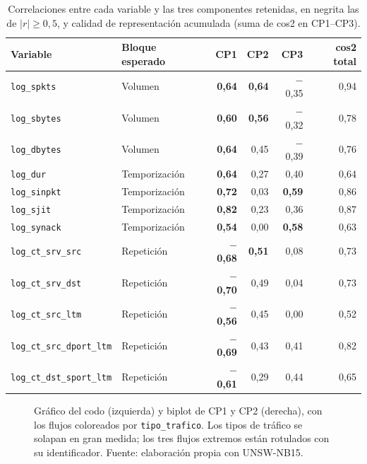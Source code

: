 \begin{table}[htbp]
  \centering
  \caption[Cargas y calidad de representación del ACP]{Correlaciones entre cada variable y las tres componentes retenidas, en negrita las de $|r| \geq 0{,}5$, y calidad de representación acumulada (suma de cos2 en CP1--CP3).}\label{tab:acp-cargas}
  \begin{tablacompacta}
  \begin{tabular}{@{}llrrrr@{}}
  \toprule
  Variable & Bloque esperado & CP1 & CP2 & CP3 & cos2 total \\
  \midrule
  \texttt{log\_spkts} & Volumen & \textbf{0,64} & \textbf{0,64} & $-$0,35 & 0,94 \\
  \texttt{log\_sbytes} & Volumen & \textbf{0,60} & \textbf{0,56} & $-$0,32 & 0,78 \\
  \texttt{log\_dbytes} & Volumen & \textbf{0,64} & 0,45 & $-$0,39 & 0,76 \\
  \texttt{log\_dur} & Temporización & \textbf{0,64} & 0,27 & 0,40 & 0,64 \\
  \texttt{log\_sinpkt} & Temporización & \textbf{0,72} & 0,03 & \textbf{0,59} & 0,86 \\
  \texttt{log\_sjit} & Temporización & \textbf{0,82} & 0,23 & 0,36 & 0,87 \\
  \texttt{log\_synack} & Temporización & \textbf{0,54} & 0,00 & \textbf{0,58} & 0,63 \\
  \texttt{log\_ct\_srv\_src} & Repetición & \textbf{$-$0,68} & \textbf{0,51} & 0,08 & 0,73 \\
  \texttt{log\_ct\_srv\_dst} & Repetición & \textbf{$-$0,70} & 0,49 & 0,04 & 0,73 \\
  \texttt{log\_ct\_src\_ltm} & Repetición & \textbf{$-$0,56} & 0,45 & 0,00 & 0,52 \\
  \texttt{log\_ct\_src\_dport\_ltm} & Repetición & \textbf{$-$0,69} & 0,43 & 0,41 & 0,82 \\
  \texttt{log\_ct\_dst\_sport\_ltm} & Repetición & \textbf{$-$0,61} & 0,29 & 0,44 & 0,65 \\
  \bottomrule
  \end{tabular}
  \end{tablacompacta}
\end{table}

\begin{figure}[htbp]
  \centering
  \caption[Codo y biplot del ACP]{Gráfico del codo (izquierda) y biplot de CP1 y CP2 (derecha), con los flujos coloreados por \texttt{tipo\_trafico}. Los tipos de tráfico se solapan en gran medida; los tres flujos extremos están rotulados con su identificador. Fuente: elaboración propia con UNSW-NB15.}
  \label{fig:acp-biplot}
\end{figure}

